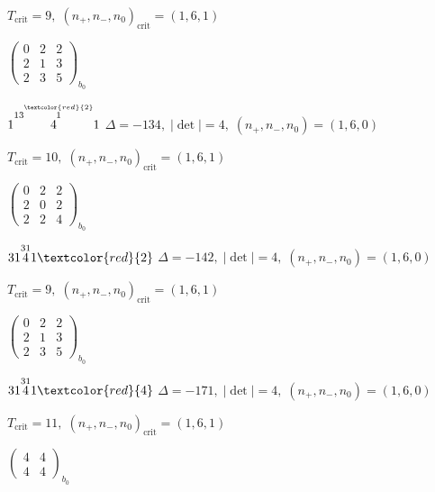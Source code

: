 \documentclass[10pt]{article}
\begin{document}
\hspace{1em}$T_{\text{crit}}=9,\; (n_+,n_-,n_0)_{\text{crit}}=(1,6,1)$

\hspace{2em}$\left(\begin{smallmatrix}0 & 2 & 2 \\ 2 & 1 & 3 \\ 2 & 3 & 5\end{smallmatrix}\right)_{\!b_0}$

\smallskip

$1\overset{13\overset{\textcolor{red}{2}}{1}}{4}1$ \quad $\Delta=-134,\; |\det|=4,\; (n_+,n_-,n_0)=(1,6,0)$

\hspace{1em}$T_{\text{crit}}=10,\; (n_+,n_-,n_0)_{\text{crit}}=(1,6,1)$

\hspace{2em}$\left(\begin{smallmatrix}0 & 2 & 2 \\ 2 & 0 & 2 \\ 2 & 2 & 4\end{smallmatrix}\right)_{\!b_0}$

\smallskip

$31\overset{31}{4}1\textcolor{red}{2}$ \quad $\Delta=-142,\; |\det|=4,\; (n_+,n_-,n_0)=(1,6,0)$

\hspace{1em}$T_{\text{crit}}=9,\; (n_+,n_-,n_0)_{\text{crit}}=(1,6,1)$

\hspace{2em}$\left(\begin{smallmatrix}0 & 2 & 2 \\ 2 & 1 & 3 \\ 2 & 3 & 5\end{smallmatrix}\right)_{\!b_0}$

$31\overset{31}{4}1\textcolor{red}{4}$ \quad $\Delta=-171,\; |\det|=4,\; (n_+,n_-,n_0)=(1,6,0)$

\hspace{1em}$T_{\text{crit}}=11,\; (n_+,n_-,n_0)_{\text{crit}}=(1,6,1)$

\hspace{2em}$\left(\begin{smallmatrix}4 & 4 \\ 4 & 4\end{smallmatrix}\right)_{\!b_0}$

\smallskip
\end{document}

